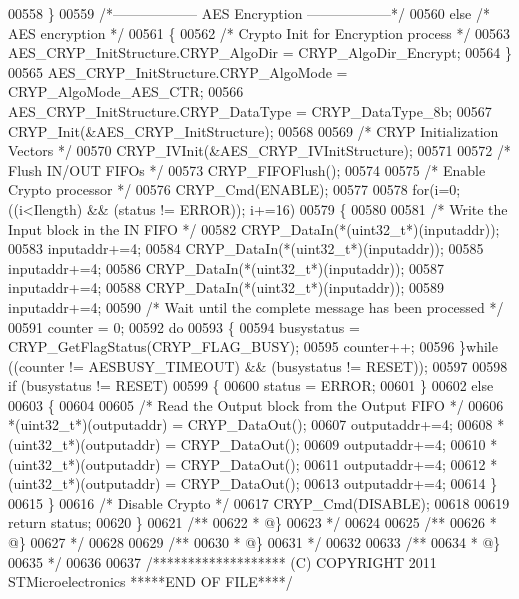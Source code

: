 \begin{DoxyCode}
00558   \}
00559   \textcolor{comment}{/*------------------ AES Encryption ------------------*/}
00560   \textcolor{keywordflow}{else} \textcolor{comment}{/* AES encryption */}
00561   \{
00562     \textcolor{comment}{/* Crypto Init for Encryption process */}
00563     AES\_CRYP\_InitStructure.CRYP_AlgoDir = CRYP_AlgoDir_Encrypt;
00564   \}
00565   AES\_CRYP\_InitStructure.CRYP_AlgoMode = CRYP_AlgoMode_AES_CTR;
00566   AES\_CRYP\_InitStructure.CRYP_DataType = CRYP_DataType_8b;
00567   CRYP_Init(&AES\_CRYP\_InitStructure);
00568 
00569   \textcolor{comment}{/* CRYP Initialization Vectors */}
00570   CRYP_IVInit(&AES\_CRYP\_IVInitStructure);
00571 
00572   \textcolor{comment}{/* Flush IN/OUT FIFOs */}
00573   CRYP_FIFOFlush();
00574 
00575   \textcolor{comment}{/* Enable Crypto processor */}
00576   CRYP_Cmd(ENABLE);
00577 
00578   \textcolor{keywordflow}{for}(i=0; ((i<Ilength) && (status != ERROR)); i+=16)
00579   \{
00580 
00581     \textcolor{comment}{/* Write the Input block in the IN FIFO */}
00582     CRYP\_DataIn(*(uint32\_t*)(inputaddr));
00583     inputaddr+=4;
00584     CRYP\_DataIn(*(uint32\_t*)(inputaddr));
00585     inputaddr+=4;
00586     CRYP\_DataIn(*(uint32\_t*)(inputaddr));
00587     inputaddr+=4;
00588     CRYP\_DataIn(*(uint32\_t*)(inputaddr));
00589     inputaddr+=4;
00590     \textcolor{comment}{/* Wait until the complete message has been processed */}
00591     counter = 0;
00592     \textcolor{keywordflow}{do}
00593     \{
00594       busystatus = CRYP\_GetFlagStatus(CRYP_FLAG_BUSY);
00595       counter++;
00596     \}\textcolor{keywordflow}{while} ((counter != AESBUSY_TIMEOUT) && (busystatus != RESET));
00597 
00598     \textcolor{keywordflow}{if} (busystatus != RESET)
00599    \{
00600        status = ERROR;
00601     \}
00602     \textcolor{keywordflow}{else}
00603     \{
00604 
00605       \textcolor{comment}{/* Read the Output block from the Output FIFO */}
00606       *(uint32\_t*)(outputaddr) = CRYP\_DataOut();
00607       outputaddr+=4;
00608       *(uint32\_t*)(outputaddr) = CRYP\_DataOut();
00609       outputaddr+=4;
00610       *(uint32\_t*)(outputaddr) = CRYP\_DataOut();
00611       outputaddr+=4;
00612       *(uint32\_t*)(outputaddr) = CRYP\_DataOut();
00613       outputaddr+=4;
00614     \}
00615   \}
00616   \textcolor{comment}{/* Disable Crypto */}
00617   CRYP_Cmd(DISABLE);
00618 
00619   \textcolor{keywordflow}{return} status;
00620 \}
00621 \textcolor{comment}{/**}
00622 \textcolor{comment}{  * @\}}
00623 \textcolor{comment}{  */}
00624 
00625 \textcolor{comment}{/**}
00626 \textcolor{comment}{  * @\}}
00627 \textcolor{comment}{  */}
00628 
00629 \textcolor{comment}{/**}
00630 \textcolor{comment}{  * @\}}
00631 \textcolor{comment}{  */}
00632 
00633 \textcolor{comment}{/**}
00634 \textcolor{comment}{  * @\}}
00635 \textcolor{comment}{  */}
00636 
00637 \textcolor{comment}{/******************* (C) COPYRIGHT 2011 STMicroelectronics *****END OF FILE****/}
\end{DoxyCode}
